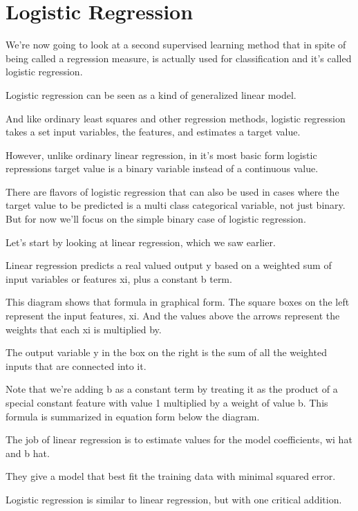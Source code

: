 \section{Logistic Regression}
\begin{multicols}{2}

We're now going to look at a second supervised learning method that in spite of being called a regression measure, is actually used for classification and it’s called logistic regression. 

Logistic regression can be seen as a kind of generalized linear model. 

And like ordinary least squares and other regression methods, logistic regression takes a set input variables, the features, and estimates a target value. 

However, unlike ordinary linear regression, in it's most basic form logistic repressions target value is a binary variable instead of a continuous value. 

There are flavors of logistic regression that can also be used in cases where the target value to be predicted is a multi class categorical variable, not just binary. But for now we'll focus on the simple binary case of logistic regression. 

Let's start by looking at linear regression, which we saw earlier. 

Linear regression predicts a real valued output y based on a weighted sum of input variables or features xi, plus a constant b term. 

This diagram shows that formula in graphical form. The square boxes on the left represent the input features, xi. And the values above the arrows represent the weights that each xi is multiplied by. 

The output variable y in the box on the right is the sum of all the weighted inputs that are connected into it. 

Note that we're adding b as a constant term by treating it as the product of a special constant feature with value 1 multiplied by a weight of value b. This formula is summarized in equation form below the diagram. 

The job of linear regression is to estimate values for the model coefficients, wi hat and b hat. 

They give a model that best fit the training data with minimal squared error. 

Logistic regression is similar to linear regression, but with one critical addition. 


\end{multicols}
